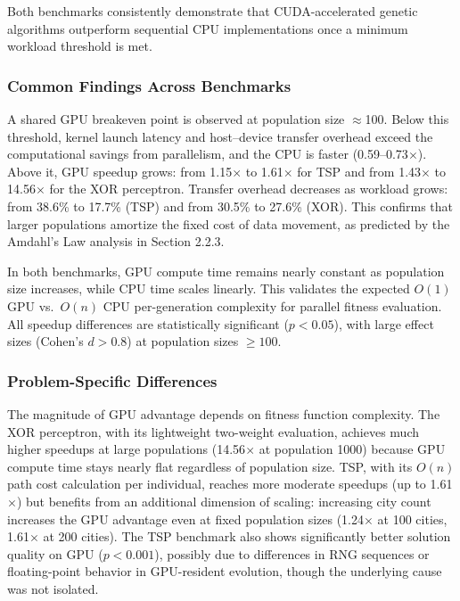 \documentclass[a4paper,14pt]{extarticle}
\begin{document}
Both benchmarks consistently demonstrate that CUDA-accelerated genetic algorithms outperform sequential CPU implementations once a minimum workload threshold is met.

\subsubsection*{Common Findings Across Benchmarks}

A shared GPU breakeven point is observed at population size $\approx$100. Below this threshold, kernel launch latency and host--device transfer overhead exceed the computational savings from parallelism, and the CPU is faster (0.59--0.73$\times$). Above it, GPU speedup grows: from 1.15$\times$ to 1.61$\times$ for TSP and from 1.43$\times$ to 14.56$\times$ for the XOR perceptron. Transfer overhead decreases as workload grows: from 38.6\% to 17.7\% (TSP) and from 30.5\% to 27.6\% (XOR). This confirms that larger populations amortize the fixed cost of data movement, as predicted by the Amdahl's Law analysis in Section 2.2.3.

In both benchmarks, GPU compute time remains nearly constant as population size increases, while CPU time scales linearly. This validates the expected $O(1)$ GPU vs.\ $O(n)$ CPU per-generation complexity for parallel fitness evaluation. All speedup differences are statistically significant ($p < 0.05$), with large effect sizes (Cohen's $d > 0.8$) at population sizes $\geq 100$.

\subsubsection*{Problem-Specific Differences}

The magnitude of GPU advantage depends on fitness function complexity. The XOR perceptron, with its lightweight two-weight evaluation, achieves much higher speedups at large populations (14.56$\times$ at population 1000) because GPU compute time stays nearly flat regardless of population size. TSP, with its $O(n)$ path cost calculation per individual, reaches more moderate speedups (up to 1.61$\times$) but benefits from an additional dimension of scaling: increasing city count increases the GPU advantage even at fixed population sizes (1.24$\times$ at 100 cities, 1.61$\times$ at 200 cities). The TSP benchmark also shows significantly better solution quality on GPU ($p < 0.001$), possibly due to differences in RNG sequences or floating-point behavior in GPU-resident evolution, though the underlying cause was not isolated.
\end{document}
